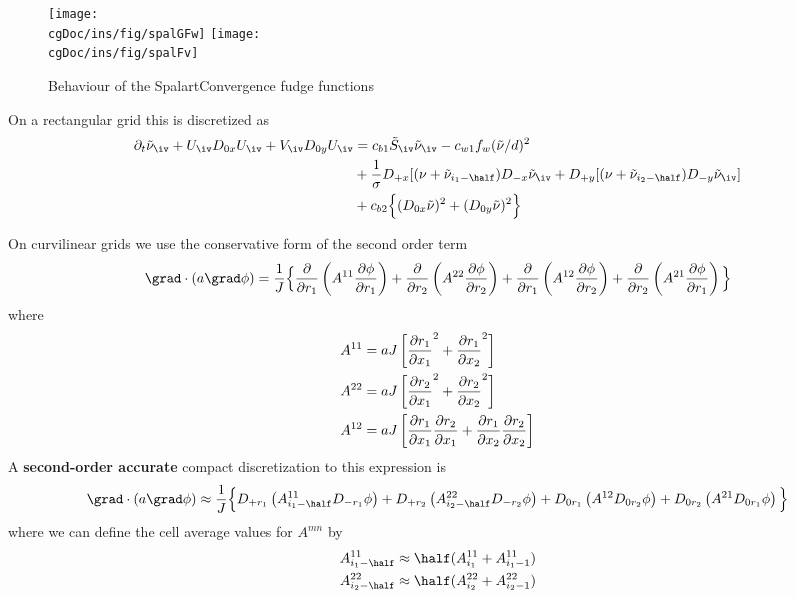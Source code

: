 \newcommand{\figWidth}{.475\linewidth}
\begin{figure}
\begin{center}
  \texttt{[image: \\cgDoc/ins/fig/spalGFw]}
  \texttt{[image: \\cgDoc/ins/fig/spalFv]}
\end{center}
\caption{Behaviour of the SpalartConvergence fudge functions}
\label{fig:SPAL-functions}
\end{figure}

On a rectangular grid this is discretized as
\begin{align*}
\partial_t \tilde{\nu}_\iv + U_\iv D_{0x} U_\iv + V_\iv D_{0y} U_\iv 
             &= c_{b1} \tilde{S}_\iv \tilde{\nu}_\iv
   - c_{w1} f_w (\tilde{\nu}/d)^2  \\
    & + {1\over\sigma}  D_{+x}[ (\nu+\tilde{\nu}_{i_1-\half})D_{-x} \tilde{\nu}_{\iv} 
                + D_{+y}[ (\nu+\tilde{\nu}_{i_2-\half})D_{-y} \tilde{\nu}_{\iv}] \\
    & + c_{b2} \Big\{ (D_{0x} \tilde{\nu})^2 + (D_{0y} \tilde{\nu})^2 \Big\}
\end{align*}


On curvilinear grids we use the conservative form of the second order term
\[
\grad\cdot( a \grad \phi) = {1\over J} \Big\lbrace  
        {\partial\over\partial r_1}\left( A^{11} {\partial \phi \over\partial r_1} \right) +
        {\partial\over\partial r_2}\left( A^{22} {\partial \phi \over\partial r_2} \right) + 
        {\partial\over\partial r_1}\left( A^{12} {\partial \phi \over\partial r_2} \right) + 
        {\partial\over\partial r_2}\left( A^{21} {\partial \phi \over\partial r_1} \right) \Big\rbrace 
\]
where
\begin{align*}
  A^{11} &=  a J\left[ {\partial r_1 \over \partial x_1 }^2 + {\partial r_1 \over \partial x_2 }^2 \right] \\
  A^{22} &=a J\left[ {\partial r_2 \over \partial x_1 }^2 + {\partial r_2 \over \partial x_2 }^2\right]\\
  A^{12} &= a J\left[ {\partial r_1\over\partial x_1}{\partial r_2\over\partial x_1} 
                 + {\partial r_1\over\partial x_2}{\partial r_2\over\partial x_2 } \right]
\end{align*}
A {\bf second-order accurate} compact discretization to this expression is
\[
  \grad\cdot( a \grad \phi) \approx {1\over J} \Big\lbrace
        D_{+ r_1}\left( A^{11}_{i_1-\half}D_{- r_1}\phi \right) +
        D_{+ r_2}\left( A^{22}_{i_2-\half}D_{- r_2}\phi \right) + 
        D_{0 r_1}\left( A^{12}            D_{0 r_2}\phi \right) + 
        D_{0 r_2}\left( A^{21}            D_{0 r_1}\phi \right) \Big\rbrace 
\]
where we can define the cell average values for $A^{mn}$ by
\begin{align*}
   A^{11}_{i_1-\half} &\approx \half( A^{11}_{i_1}+A^{11}_{i_1-1} ) \\
   A^{22}_{i_2-\half} &\approx \half( A^{22}_{i_2}+A^{22}_{i_2-1} )
\end{align*}


